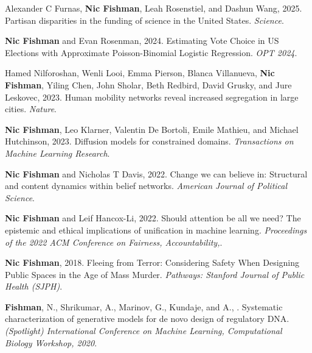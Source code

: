 \begin{cvparagraph}


\begin{addmargin}[2em]{0em}

Alexander C Furnas, \textbf{Nic Fishman}, Leah Rosenstiel, and Dashun Wang, 2025. Partisan disparities in the funding of science in the United States. \textit{Science}.

\textbf{Nic Fishman} and Evan Rosenman, 2024. Estimating Vote Choice in US Elections with Approximate Poisson-Binomial Logistic Regression. \textit{OPT 2024}.

Hamed Nilforoshan, Wenli Looi, Emma Pierson, Blanca Villanueva, \textbf{Nic Fishman}, Yiling Chen, John Sholar, Beth Redbird, David Grusky, and Jure Leskovec, 2023. Human mobility networks reveal increased segregation in large cities. \textit{Nature}.

\textbf{Nic Fishman}, Leo Klarner, Valentin De Bortoli, Emile Mathieu, and Michael Hutchinson, 2023. Diffusion models for constrained domains. \textit{Transactions on Machine Learning Research}.

\textbf{Nic Fishman} and Nicholas T Davis, 2022. Change we can believe in: Structural and content dynamics within belief networks. \textit{American Journal of Political Science}.

\textbf{Nic Fishman} and Leif Hancox-Li, 2022. Should attention be all we need? The epistemic and ethical implications of unification in machine learning. \textit{Proceedings of the 2022 ACM Conference on Fairness, Accountability,}.

\textbf{Nic Fishman}, 2018. Fleeing from Terror: Considering Safety When Designing Public Spaces in the Age of Mass Murder. \textit{Pathways: Stanford Journal of Public Health (SJPH)}.

\textbf{Fishman}, N., Shrikumar, A., Marinov, G., Kundaje, and A., . Systematic characterization of generative models for de novo design of regulatory DNA. \textit{(Spotlight) International Conference on Machine Learning, Computational Biology Workshop, 2020}.

\end{addmargin}



\end{cvparagraph}
